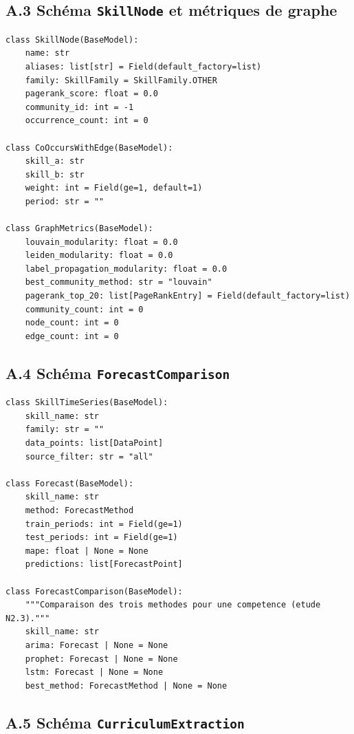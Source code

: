 \documentclass[11pt,a4paper,openany]{report}
\begin{document}
\subsection*{A.3 Sch\'ema \texttt{SkillNode} et m\'etriques de graphe}

\begin{lstlisting}[caption={Extrait de \texttt{skillnav/schemas/graph.py}}]
class SkillNode(BaseModel):
    name: str
    aliases: list[str] = Field(default_factory=list)
    family: SkillFamily = SkillFamily.OTHER
    pagerank_score: float = 0.0
    community_id: int = -1
    occurrence_count: int = 0

class CoOccursWithEdge(BaseModel):
    skill_a: str
    skill_b: str
    weight: int = Field(ge=1, default=1)
    period: str = ""

class GraphMetrics(BaseModel):
    louvain_modularity: float = 0.0
    leiden_modularity: float = 0.0
    label_propagation_modularity: float = 0.0
    best_community_method: str = "louvain"
    pagerank_top_20: list[PageRankEntry] = Field(default_factory=list)
    community_count: int = 0
    node_count: int = 0
    edge_count: int = 0
\end{lstlisting}

\subsection*{A.4 Sch\'ema \texttt{ForecastComparison}}

\begin{lstlisting}[caption={Extrait de \texttt{skillnav/schemas/timeseries.py}}]
class SkillTimeSeries(BaseModel):
    skill_name: str
    family: str = ""
    data_points: list[DataPoint]
    source_filter: str = "all"

class Forecast(BaseModel):
    skill_name: str
    method: ForecastMethod
    train_periods: int = Field(ge=1)
    test_periods: int = Field(ge=1)
    mape: float | None = None
    predictions: list[ForecastPoint]

class ForecastComparison(BaseModel):
    """Comparaison des trois methodes pour une competence (etude N2.3)."""
    skill_name: str
    arima: Forecast | None = None
    prophet: Forecast | None = None
    lstm: Forecast | None = None
    best_method: ForecastMethod | None = None
\end{lstlisting}

\subsection*{A.5 Sch\'ema \texttt{CurriculumExtraction}}
\end{document}

